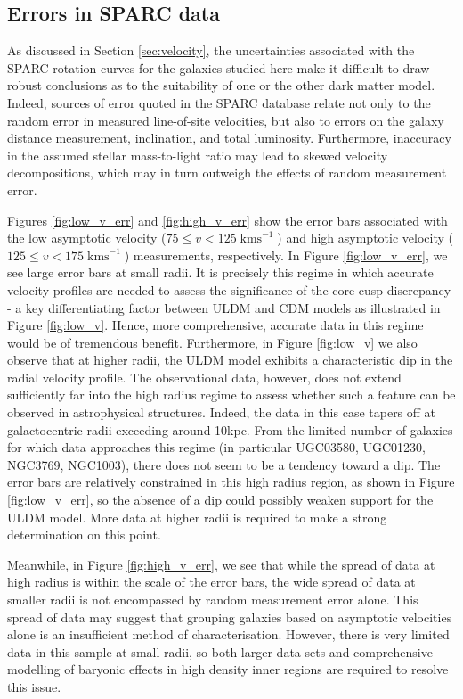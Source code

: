\documentclass{pasa}%
\begin{document}
\begin{appendix}
 
\section{Errors in SPARC data}\label{sec:errors}

As discussed in Section \ref{sec:velocity}, the uncertainties associated with the SPARC rotation curves for the galaxies studied here make it difficult to draw robust conclusions as to the suitability of one or the other dark matter model. Indeed, sources of error quoted in the SPARC database relate not only to the random error in measured line-of-site velocities, but also to errors on the galaxy distance measurement, inclination, and total luminosity. Furthermore, inaccuracy in the assumed stellar mass-to-light ratio may lead to skewed velocity decompositions, which may in turn outweigh the effects of random measurement error.

Figures \ref{fig:low_v_err} and \ref{fig:high_v_err} show the error bars associated with the low asymptotic velocity ($75 \leq v < 125\operatorname{kms}^{-1}$) and high asymptotic velocity ($125 \leq v < 175\operatorname{kms}^{-1}$) measurements, respectively. In Figure \ref{fig:low_v_err}, we see large error bars at small radii. It is precisely this regime in which accurate velocity profiles are needed to assess the significance of the core-cusp discrepancy - a key differentiating factor between ULDM and CDM models as illustrated in Figure \ref{fig:low_v}. Hence, more comprehensive, accurate data in this regime would be of tremendous benefit. Furthermore, in Figure \ref{fig:low_v} we also observe that at higher radii, the ULDM model exhibits a characteristic dip in the radial velocity profile. The observational data, however, does not extend sufficiently far into the high radius regime to assess whether such a feature can be observed in astrophysical structures. Indeed, the data in this case tapers off at galactocentric radii exceeding around 10kpc. From the limited number of galaxies for which data approaches this regime (in particular  UGC03580, UGC01230, NGC3769, NGC1003), there does not seem to be a tendency toward a dip. The error bars are relatively constrained in this high radius region, as shown in Figure \ref{fig:low_v_err}, so the absence of a dip could possibly weaken support for the ULDM model. More data at higher radii is required to make a strong determination on this point. 

Meanwhile, in Figure \ref{fig:high_v_err}, we see that while the spread of data at high radius is within the scale of the error bars, the wide spread of data at smaller radii is not encompassed by random measurement error alone. This spread of data may suggest that grouping galaxies based on asymptotic velocities alone is an insufficient method of characterisation. However, there is very limited data in this sample at small radii, so both larger data sets and comprehensive modelling of baryonic effects in high density inner regions are required to resolve this issue. 




\end{appendix}
\end{document}
